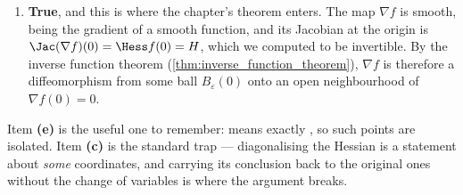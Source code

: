 \begin{exercisesolution}
\begin{enumerate}[label=\textbf{(\alph*)}]
    right-hand side of \eqref{eq:hessian_gradient_diffeomorphism_taylor} is bounded by a constant times
    $\lvert x\rvert^2$ near $0$. Vanishing to first order at a point is precisely what $O(\lvert
    x\rvert^2)$ records.
  \item \textbf{True}, and this is where the chapter's theorem enters. The map $\nabla f$ is smooth,
    being the gradient of a smooth function, and its Jacobian at the origin is
    $\Jac(\nabla f)(0) = \Hess f(0) = H$, which we computed to be invertible. By the inverse function
    theorem (\cref{thm:inverse_function_theorem}), $\nabla f$ is therefore a diffeomorphism from some
    ball $B_\varepsilon(0)$ onto an open neighbourhood of $\nabla f(0) = 0$.
\end{enumerate}
\begin{remark}
Item \textbf{(e)} is the useful one to remember:  means exactly
, so such points are isolated. Item \textbf{(c)} is
the standard trap --- diagonalising the Hessian is a statement about \emph{some} coordinates, and
carrying its conclusion back to the original ones without the change of variables is where the
argument breaks.
\end{remark}
\end{exercisesolution}

